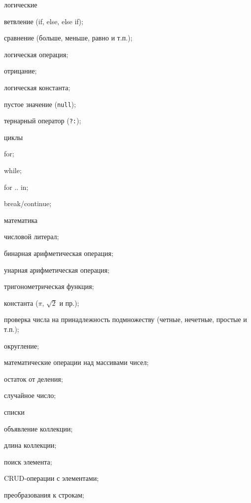 \begin{itemize*}
	\item логические
	\begin{itemize*}
		\item ветвление (if, else, else if);
		\item сравнение (больше, меньше, равно и т.п.);
		\item логическая операция;
		\item отрицание;
		\item логическая константа;
		\item пустое значение (\lstinline|null|);
		\item тернарный оператор (\lstinline|?:|);	
	\end{itemize*}
	\item циклы
	\begin{itemize*}
		\item for;
		\item while;
		\item for .. in;
		\item break/continue;
	\end{itemize*}
	\item математика
	\begin{itemize*}
		\item числовой литерал;
		\item бинарная арифметическая операция;
		\item унарная арифметическая операция;
		\item тригонометрическая функция;
		\item константа ($\pi$, $\sqrt{2}$ и пр.);
		\item проверка числа на принадлежность подмножеству (четные, нечетные, простые и т.п.);
		\item округление;
		\item математические операции над массивами чисел;
		\item остаток от деления;
		\item случайное число;
	\end{itemize*}
	\item списки
	\begin{itemize*}
		\item объявление коллекции;
		\item длина коллекции;
		\item поиск элемента;
		\item CRUD-операции с элементами;
		\item преобразования к строкам;

\end{itemize*}
\end{itemize*}
